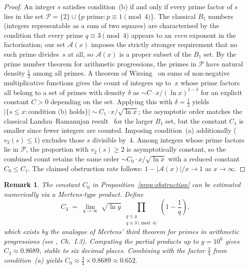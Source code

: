 \documentclass[pdflatex,sn-mathphys-num,Numbered]{sn-jnl}
\theoremstyle{thmstyleone}
\theoremstyle{thmstylethree}
\theoremstyle{thmstyletwo}
\newtheorem{remark}[theorem]{Remark}
\numberwithin{equation}{section}
\begin{document}
\begin{proof}
An integer $s$ satisfies condition~(b) if and only if every prime
factor of $s$ lies in the set $\mathcal{P} = \{2\} \cup
\{p \text{ prime} : p \equiv 1 \pmod{4}\}$.
The classical $B_1$ numbers (integers representable as a sum
of two squares) are characterised by the condition that every prime
$q \equiv 3 \pmod{4}$ appears to an \emph{even} exponent in the
factorisation; our set $\mathcal{A}(x)$ imposes the strictly
stronger requirement that no such prime divides~$s$ at all,
so $\mathcal{A}(x)$ is a proper subset of the $B_1$ set.
By the prime number theorem for arithmetic progressions, the primes
in $\mathcal{P}$ have natural density $\frac{1}{2}$ among all primes.
A theorem of Wirsing~\cite{Wirsing1961} on sums of non-negative
multiplicative functions gives the count of integers up to~$x$ whose
prime factors all belong to a set of primes with
density $\delta$ as $\sim C \cdot x/(\ln x)^{1-\delta}$
for an explicit constant $C > 0$ depending on the set.
Applying this with $\delta = \frac{1}{2}$ yields
$|\{s \leq x : \text{condition (b) holds}\}| \sim C_1 \cdot x/\sqrt{\ln x}$;
the asymptotic order matches the classical Landau--Ramanujan
result~\cite{Landau1908} for the larger $B_1$ set, but the
constant $C_1$ is smaller since fewer integers are counted.
Imposing condition~(a) additionally ($v_2(s) \leq 1$) excludes those
$s$ divisible by~$4$.
Among integers whose prime factors lie in $\mathcal{P}$,
the proportion with $v_2(s) \geq 2$ is asymptotically constant,
so the combined count retains
the same order $\sim C_0 \cdot x/\sqrt{\ln x}$ with a reduced
constant $C_0 \leq C_1$.
The claimed obstruction rate follows:
$1 - |\mathcal{A}(x)|/x \to 1$ as $x \to \infty$.
\end{proof}

\begin{remark}\label{rem:C0value}
The constant $C_0$ in Proposition~\textup{\ref{prop:obstruction}} can
be estimated numerically via a Mertens-type product.
Define
\[
C_3 \;=\; \lim_{y \to \infty}\;
\sqrt{\ln y}\;
\prod_{\substack{q \leq y \\ q \equiv 3 \pmod{4}}}
\left(1 - \frac{1}{q}\right),
\]
which exists by the analogue of Mertens' third theorem for primes in
arithmetic progressions
\textup{(}see \textup{\cite{Tenenbaum1995}}, Ch.~I.3\textup{)}.
Computing the partial products up to $y = 10^6$ gives
$C_3 \approx 0.8689$, stable to six decimal places.
Combining with the factor $\frac{3}{4}$ from condition~\textup{(a)}
yields $C_0 \approx \frac{3}{4} \times 0.8689 \approx 0.652$.
\end{remark}
\end{document}
